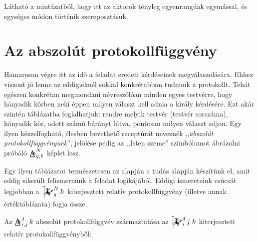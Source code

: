 \documentclass{article}
\newcommand{\eye}{\bigtriangleup\mspace{-14.607mu}\divideontimes}
\newcommand{\eyefun}[4]{\mathop{\eye}^{#1}_{#2,#3}#4}
\newcommand{\mainfunext}[3]{\left\uparrow\!\!\!\mathwitch*_{#2}^{#1}#3\right.}
\begin{document}
	Látható a mintázatból, hogy itt az aktorok tényleg egyenrangúak egymással, és egységes módon történik szereposztásuk.

	\section{Az abszolút protokollfüggvény}

	Hamarosan végre itt az idő a feladat eredeti kérdéseinek megválaszolására. Ehhez viszont jó lenne az eddigieknél sokkal konkrétabban tudnunk a protokollt.
	Tehát egészen konkrétan megmondani névreszólóan minden egyes testvérre, hogy hányadik körben neki éppen milyen választ kell adnia a király kérdésére.
	Ezt akár szintén táblázatba foglalhatjuk: rendre melyik testvér (testvér sorszáma), hányadik kör, adott számú bárányt látva, pontosan milyen választ adjon.
	Egy ilyen kézzelfogható, élesben bevethető receptúrát neveznék ,,\emph{abszolút protokollfüggvénynek}'', jelölése pedig az ,,Isten szeme'' szimbólumot ábrázolni próbáló $\eyefun Nqk$ képlet lesz.

	Egy ilyen táblázatot természetesen az alapján a tudás alapján készítünk el, amit eddig sikerült felismernünk a feladat logikájából.
	Eddigi ismereteink csúcsát legjobban a $\mainfunext Nqk$ kiterjesztett relatív protokollfüggvény (illetve annak értéktáblázata) fogja össze.

	Az $\eyefun4ijk$ abszolút protokollfüggvév származtatása az $\mainfunext 4ijk$ kiterjesztett relatív protokollfüggvényből:

	\setlength{\extrarowheight}{8px}
\end{document}

